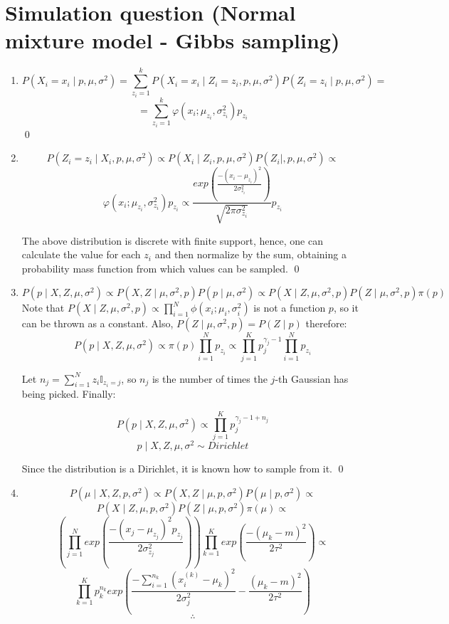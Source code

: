 \documentclass[12pt,letterpaper]{article}
\begin{document}
\newpage
\section*{Simulation question (Normal mixture model - Gibbs sampling)}
\begin{enumerate}[leftmargin=!,labelindent=5pt]
\item  
$$
P(X_i = x_i \mid p,\mu, \sigma^2) =
\sum_{z_i = 1}^{k}P(X_i = x_i \mid Z_i = z_i, p, \mu, \sigma^2)
P(Z_i = z_i \mid p,\mu, \sigma^2) = 
$$
$$ = 
\sum_{z_i = 1}^{k}\varphi(x_i; \mu_{z_i}, \sigma^2_{z_i})p_{z_i}
$$
\qed

\item 

$$
P(Z_i = z_i \mid X_i, p, \mu, \sigma^2) \propto
P(X_i \mid Z_i, p, \mu, \sigma^2)P(Z_i \mid, p, \mu, \sigma^2)
\propto
$$
$$
\varphi(x_i; \mu_{z_i},\sigma^2_{z_i}) p_{z_i} \propto
\frac{exp \left(
\frac{-(x_i-\mu_{z_i})^2}{2\sigma^2_{z_i}}
\right)}{\sqrt{2\pi\sigma^2_{z_i}}} p_{z_i}
$$

The above distribution is discrete with finite support, hence,
one can calculate the value for each $z_i$ and then normalize
by the sum, obtaining a probability mass function from which
values can be sampled.
\qed

\item
$$
P(p \mid X, Z, \mu, \sigma^2) \propto
P(X,Z \mid \mu, \sigma^2, p) P(p \mid \mu, \sigma^2) \propto
P(X \mid Z, \mu, \sigma^2, p)P(Z \mid \mu, \sigma^2, p)\pi(p)
$$
Note that
$P(X \mid Z, \mu, \sigma^2, p) \propto
\prod_{i=1}^N\phi(x_i;\mu_i,\sigma^2_i)$ is not a function
$p$, so it can be thrown as a constant. Also, 
$P(Z \mid \mu, \sigma^2, p) = P(Z \mid p)$
therefore:
$$
P(p \mid X, Z, \mu, \sigma^2) \propto
\pi(p) \prod_{i=1}^N p_{z_i} \propto
\prod_{j=1}^K p_j^{\gamma_j -1}\prod_{i=1}^N p_{z_i} 
$$

Let $n_j = \sum_{i=1}^N z_i \mathbb I_{z_i = j}$, so $n_j$ is
the number of times the $j$-th Gaussian has being picked. Finally:

$$
P(p \mid X, Z, \mu, \sigma^2) \propto
\prod_{j=1}^K p_j^{\gamma_j -1 + n_j} 
$$
$$
p \mid X, Z, \mu, \sigma^2 \sim Dirichlet
$$

Since the distribution is a Dirichlet, it is known how to
sample from it.
\qed

\item
$$
P(\mu \mid X, Z, p, \sigma^2) \propto
P(X,Z \mid \mu, p, \sigma^2)P(\mu \mid p, \sigma^2) \propto
$$
$$
P(X \mid Z, \mu, p, \sigma^2)P(Z \mid \mu, p, \sigma^2)\pi(\mu) \propto
$$
$$
\left(
\prod_{j=1}^N exp \left(
	\frac{-(x_j - \mu_{z_j})^2 p_{z_j}}{2\sigma^2_{z_j}}
	\right)
\right)
\prod_{k=1}^K exp \left(
	\frac{-(\mu_k - m)^2}{2\tau^2}
\right) \propto
$$
$$
\prod_{k=1}^K
p_k^{n_k}
exp \left(
	\frac{-\sum_{i=1}^{n_k}(x_i^{(k)} - \mu_k)^2}{2\sigma_j^2} -
	\frac{(\mu_k - m)^2}{2\tau^2}
\right)
$$
$$\therefore$$


\end{enumerate}
\end{document}
